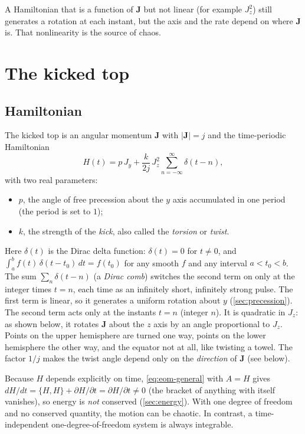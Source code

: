 \documentclass[11pt,a4paper]{article}
\newcommand{\vJ}{\bm{J}}
\newcommand{\PB}[2]{\{#1,#2\}}
\begin{document}
A Hamiltonian that is a function of $\vJ$ but not linear (for example $J_z^2$) still generates a rotation at each
instant, but the axis and the rate depend on where $\vJ$ is. That nonlinearity is the source of chaos.

\section{The kicked top}\label{sec:model}

\subsection{Hamiltonian}

The kicked top is an angular momentum $\vJ$ with $|\vJ| = j$ and the time-periodic Hamiltonian
\begin{equation}\label{eq:H}
  \boxed{H(t) = p\, J_y + \frac{k}{2j}\, J_z^2 \sum_{n=-\infty}^{\infty} \delta(t-n) ,}
\end{equation}
with two real parameters:
\begin{itemize}
  \item $p$, the angle of free precession about the $y$ axis accumulated in one period (the period is set to $1$);
  \item $k$, the strength of the \emph{kick}, also called the \emph{torsion} or \emph{twist}.
\end{itemize}
Here $\delta(t)$ is the Dirac delta function: $\delta(t) = 0$ for $t\ne0$, and $\int_a^b f(t)\,\delta(t-t_0)\,dt =
f(t_0)$ for any smooth $f$ and any interval $a < t_0 < b$. The sum $\sum_n\delta(t-n)$ (a \emph{Dirac comb}) switches
the second term on only at the integer times $t = n$, each time as an infinitely short, infinitely strong pulse.
The first term is linear, so it generates a uniform rotation about $y$ (\cref{sec:precession}). The second term acts
only at the instants $t = n$ (integer $n$). It is quadratic in $J_z$: as shown below, it rotates $\vJ$ about the $z$
axis by an angle proportional to $J_z$. Points on the upper hemisphere are turned one way, points on the lower
hemisphere the other way, and the equator not at all, like twisting a towel. The factor $1/j$ makes the twist angle depend only on the
\emph{direction} of $\vJ$ (see below).

Because $H$ depends explicitly on time, \eqref{eq:eom-general} with $A = H$ gives $dH/dt = \PB{H}{H} + \partial
H/\partial t = \partial H/\partial t \ne 0$ (the bracket of anything with itself vanishes), so energy is \emph{not} conserved
(\cref{sec:energy}). With one degree of freedom and no conserved quantity, the motion can be chaotic. In contrast, a
time-independent one-degree-of-freedom system is always integrable.
\end{document}
